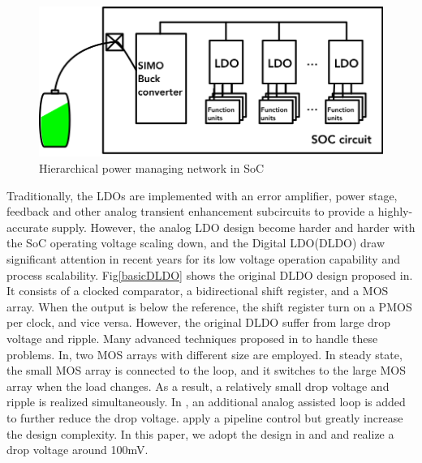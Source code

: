 \documentclass[draftcls, journal]{IEEEtran}
\begin{document}
\begin{figure}[h!]
    \centering
    \includegraphics[width=\linewidth]{pic/DLDOsche/SOCcircuit.png}
    \caption{Hierarchical power managing network in SoC}
    \label{hierarchical}
\end{figure}
Traditionally, the LDOs are implemented with an error amplifier, power stage, feedback and other analog transient enhancement subcircuits to provide a highly-accurate supply\cite{ALDO1,ALDO2,ALDO3}. However, the analog LDO design become harder and harder with the SoC operating voltage scaling down, and the Digital LDO(DLDO) draw significant attention in recent years for its low voltage operation capability and process scalability. Fig\ref{basicDLDO} shows the original DLDO design proposed in\cite{original}. It consists of a clocked comparator, a bidirectional shift register, and a MOS array. When the output is below the reference, the shift register turn on a PMOS per clock, and vice versa. However, the original DLDO suffer from large drop voltage and ripple. Many advanced techniques proposed in \cite{AALDO, pipeline, coarse-fine, eventDriven,recursive} to handle these problems. In\cite{coarse-fine}, two MOS arrays with different size are employed. In steady state, the small MOS array is connected to the loop, and it switches to the large MOS array when the load changes. As a result, a relatively small drop voltage and ripple is realized simultaneously. In \cite{AALDO}, an additional analog assisted loop is added to further reduce the drop voltage. \cite{pipeline} apply a pipeline control but greatly increase the design complexity. In this paper, we adopt the design in \cite{AALDO} and \cite{coarse-fine} and realize a drop voltage around 100mV.
\end{document}
